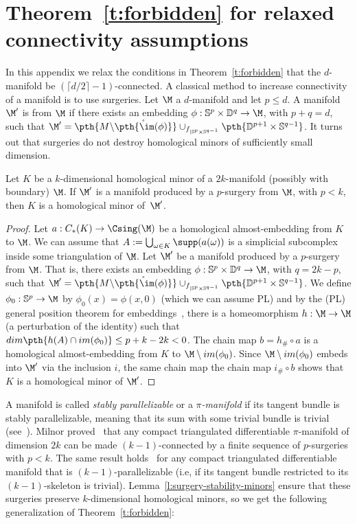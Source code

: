 \section{Theorem~\ref{t:forbidden} for relaxed connectivity assumptions}\label{app:relax}
%
In this appendix we relax the conditions in Theorem~\ref{t:forbidden} that the $d$-manifold be $(\lceil d/2 \rceil -1)$-connected. 
%
\medskip
%
A classical method to increase connectivity of a manifold is to use surgeries. Let $\M$ a $d$-manifold and let $p \le d$. A manifold~$\M'$ is  from $\M$ if there exists an embedding $\phi:\mathbb{S}^p\times \mathbb{D}^{q}\to \M$, with $p+q=d$, such that $\M'= \pth{M\backslash \mathring{\pth{\im(\phi)}}}\cup_{f_{|\mathbb{S}^p\times\mathbb{S}^{q-1}}}\pth{\mathbb{D}^{p+1}\times\mathbb{S}^{q-1}}$. It turns out that surgeries do not destroy homological minors of sufficiently small dimension.
%
\begin{lemma}\label{l:surgery-stability-minors}
  Let $K$ be a $k$-dimensional homological minor of a $2k$-manifold (possibly with boundary) $\M$. If $\M'$ is a manifold produced by a $p$-surgery from $\M$,
  with $p < k$, then $K$ is a homological minor of~$\M'$.
\end{lemma}
\begin{proof}
  Let $a:C_*(K)\to \Csing(\M)$ be a homological almost-embedding from $K$ to $\M$. We can assume that $A:=\bigcup_{\omega\in K}\supp(a(\omega))$ is a simplicial subcomplex inside some triangulation of $\M$. Let $\M'$ be a manifold produced by a $p$-surgery from $\M$. That is, there exists an embedding $\phi:\mathbb{S}^p\times\mathbb{D}^q\to \M$, with  $q = 2k-p$, such that $\M'= \pth{M\backslash \mathring{\pth{\im(\phi)}}}\cup_{f_{|\mathbb{S}^p\times\mathbb{S}^{q-1}}}\pth{\mathbb{D}^{p+1}\times\mathbb{S}^{q-1}}$. We define $\phi_0:\mathbb{S}^p\to\M$ by $\phi_0(x)=\phi(x,0)$ (which we can assume PL) and by the (PL) general position theorem for embeddings~\cite[$\S$5.3]{Rourke1972IntroductionTP}, there is a homeomorphism $h:\M\to\M$ (a perturbation of the identity) such that $dim\pth{h( A)\cap im(\phi_0)}\leq p+k-2k<0$. The chain map $b=h_{\#}\circ a$ is a homological almost-embedding from $K$ to $\M\setminus im(\phi_0)$. Since $\M\setminus im(\phi_0)$ embeds into $\M'$ via the inclusion $i$, the same chain map the chain map $i_\#\circ b$ shows that $K$ is a homological minor of $\M'$.
\end{proof}
%
A manifold is called \emph{stably parallelizable} or a \emph{$\pi$-manifold} if its tangent bundle is stably parallelizable, meaning that its sum with some trivial bundle is trivial (see~\cite{milnor}). Milnor proved~\cite[Corollary to Theorem~$2$]{milnor} that any compact triangulated differentiable $\pi$-manifold of dimension $2k$ can be made $(k-1)$-connected by a finite sequence of $p$-surgeries with $p<k$. The same result holds~\cite[Corollary to Theorem~$3$]{milnor} for any compact triangulated differentiable manifold that is $(k-1)$-parallelizable (i.e, if its tangent bundle restricted to its $(k-1)$-skeleton is trivial). Lemma~\ref{l:surgery-stability-minors} ensure that these surgeries preserve $k$-dimensional homological minors, so we get the following generalization of Theorem~\ref{t:forbidden}:
